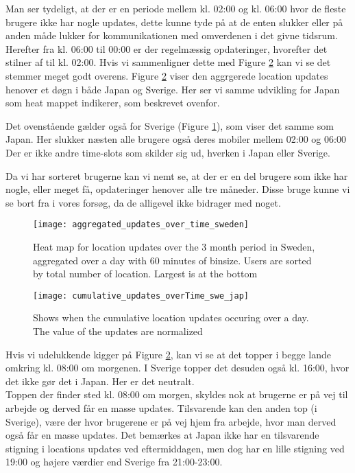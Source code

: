 Man ser tydeligt, at der er en periode mellem kl. 02:00 og kl. 06:00 hvor de fleste brugere ikke har nogle updates, dette kunne tyde på at de enten slukker eller på anden måde lukker for kommunikationen med omverdenen i det givne tidsrum. Herefter fra kl. 06:00 til 00:00 er der regelmæssig opdateringer, hvorefter det stilner af til kl. 02:00. Hvis vi sammenligner dette med Figure \ref{fig:cumu_loc_time_jap_swe} kan vi se det stemmer meget godt overens. Figure \ref{fig:cumu_loc_time_jap_swe} viser den aggrgerede location updates henover et døgn i både Japan og Sverige. Her ser vi samme udvikling for Japan som heat mappet indikerer, som beskrevet ovenfor. 

Det ovenstående gælder også for Sverige (Figure \ref{fig:agg_heatmap_swe}), som viser det samme som Japan. Her slukker næsten alle brugere også deres mobiler mellem 02:00 og 06:00
Der er ikke andre time-slots som skilder sig ud, hverken i Japan eller Sverige. 

Da vi har sorteret brugerne kan vi nemt se, at der er en del brugere som ikke har nogle, eller meget få, opdateringer henover alle tre måneder. Disse bruge kunne vi se bort fra i vores forsøg, da de alligevel ikke bidrager med noget. 


\begin{figure}[H]
    \hspace*{-0.8cm}
    \centering
    \texttt{[image: aggregated\_updates\_over\_time\_sweden]}
    \caption{Heat map for location updates over the 3 month period in Sweden, aggregated over a day with 60 minutes of binsize. Users are sorted by total number of location. Largest is at the bottom}
    \label{fig:agg_heatmap_swe}
\end{figure}

\begin{figure}[H]
    \hspace*{-1.8cm}
    \centering
    \texttt{[image: cumulative\_updates\_overTime\_swe\_jap]}
    \caption{Shows when the cumulative location updates occuring over a day. The value of the updates are normalized}
    \label{fig:cumu_loc_time_jap_swe}
\end{figure}

Hvis vi udelukkende kigger på Figure \ref{fig:cumu_loc_time_jap_swe}, kan vi se at det topper i begge lande omkring kl. 08:00 om morgenen. I Sverige topper det desuden også kl. 16:00, hvor det ikke gør det i Japan. Her er det neutralt. \\
Toppen der finder sted kl. 08:00 om morgen, skyldes nok at brugerne er på vej til arbejde og derved får en masse updates. Tilsvarende kan den anden top (i Sverige), være der hvor brugerene er på vej hjem fra arbejde, hvor man derved også får en masse updates. Det bemærkes at Japan ikke har en tilsvarende stigning i locations updates ved eftermiddagen, men dog har en lille stigning ved 19:00 og højere værdier end Sverige fra 21:00-23:00.\\

